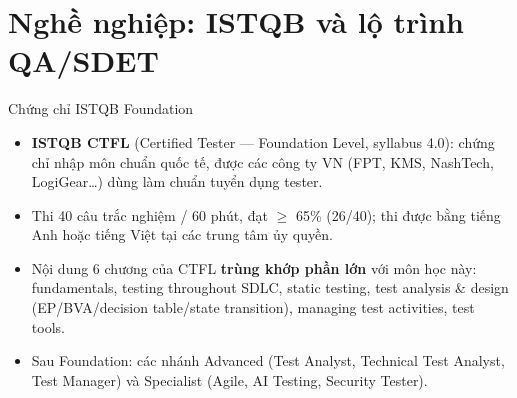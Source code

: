 \documentclass[aspectratio=169,12pt]{beamer}
\begin{document}
\section{Nghề nghiệp: ISTQB và lộ trình QA/SDET}

\begin{frame}{Chứng chỉ ISTQB Foundation}
  \begin{itemize}
    \item \textbf{ISTQB CTFL} (Certified Tester --- Foundation Level, syllabus 4.0): chứng chỉ nhập môn chuẩn quốc tế, được các công ty VN (FPT, KMS, NashTech, LogiGear\ldots) dùng làm chuẩn tuyển dụng tester.
    \item Thi 40 câu trắc nghiệm / 60 phút, đạt $\geq$ 65\% (26/40); thi được bằng tiếng Anh hoặc tiếng Việt tại các trung tâm ủy quyền.
    \item Nội dung 6 chương của CTFL \textbf{trùng khớp phần lớn} với môn học
          này: fundamentals, testing throughout SDLC, static testing, test
          analysis \& design (EP/BVA/decision table/state transition),
          managing test activities, test tools.
    \item Sau Foundation: các nhánh Advanced (Test Analyst, Technical Test Analyst, Test Manager) và Specialist (Agile, AI Testing, Security Tester).
  \end{itemize}
\end{frame}
\end{document}
